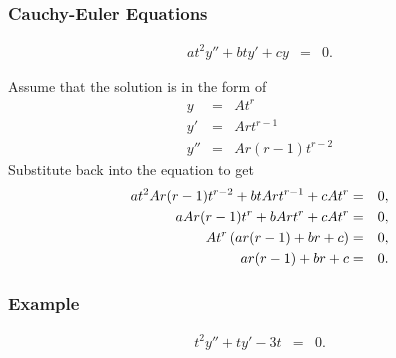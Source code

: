 \begin{frame}
  \frametitle{Cauchy-Euler Equations}
  \vspace{-1cm}
   \begin{eqnarray*}
    a t^2 y'' + b t y' + c y & = & 0.
  \end{eqnarray*}

  {
    Assume that the solution is in the form of
    \begin{eqnarray*}
      y & = & A t^r\\
      y' & = & A r t^{r-1} \\
      y'' & = & A r (r-1) t^{r-2}
    \end{eqnarray*}
    Substitute back into the equation to get
    \begin{eqnarray*}
      a t^2 A r (r-1) t^{r-2} + b t A r t^{r-1} + c A t^r & = & 0, \\
      a A r (r-1) t^{r} + b A r t^{r} + c A t^r & = & 0, \\
      A t^r \left( a r (r-1) + br + c \right) & = & 0, \\
      a r (r-1) + br + c & = & 0.
    \end{eqnarray*}
  }
    

\end{frame}


\begin{frame}
  \frametitle{Example}

  \begin{eqnarray*}
    t^2 y'' + t y' - 3t & = & 0.
  \end{eqnarray*}



\end{frame}


